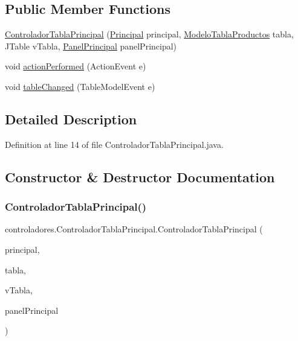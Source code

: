 \subsection*{Public Member Functions}
\begin{DoxyCompactItemize}
\item 
\mbox{\hyperlink{classcontroladores_1_1_controlador_tabla_principal_a279325fa05462ea55845646a812d9a84}{Controlador\+Tabla\+Principal}} (\mbox{\hyperlink{classvistas_1_1_principal}{Principal}} principal, \mbox{\hyperlink{classmodelos_1_1_modelo_tabla_productos}{Modelo\+Tabla\+Productos}} tabla, J\+Table v\+Tabla, \mbox{\hyperlink{classpaneles_1_1_panel_principal}{Panel\+Principal}} panel\+Principal)
\item 
void \mbox{\hyperlink{classcontroladores_1_1_controlador_tabla_principal_a7ccd2cb9c153dbdd5d572be6d7a7aa5f}{action\+Performed}} (Action\+Event e)
\item 
void \mbox{\hyperlink{classcontroladores_1_1_controlador_tabla_principal_af223db673a317026cd0ce727b661fdea}{table\+Changed}} (Table\+Model\+Event e)
\end{DoxyCompactItemize}


\subsection{Detailed Description}


Definition at line 14 of file Controlador\+Tabla\+Principal.\+java.



\subsection{Constructor \& Destructor Documentation}
\mbox{\label{classcontroladores_1_1_controlador_tabla_principal_a279325fa05462ea55845646a812d9a84}} 
\subsubsection{\texorpdfstring{Controlador\+Tabla\+Principal()}{ControladorTablaPrincipal()}}
{\footnotesize\ttfamily controladores.\+Controlador\+Tabla\+Principal.\+Controlador\+Tabla\+Principal (\begin{DoxyParamCaption}\item[{\mbox{\hyperlink{classvistas_1_1_principal}{Principal}}}]{principal,  }\item[{\mbox{\hyperlink{classmodelos_1_1_modelo_tabla_productos}{Modelo\+Tabla\+Productos}}}]{tabla,  }\item[{J\+Table}]{v\+Tabla,  }\item[{\mbox{\hyperlink{classpaneles_1_1_panel_principal}{Panel\+Principal}}}]{panel\+Principal }\end{DoxyParamCaption})}



